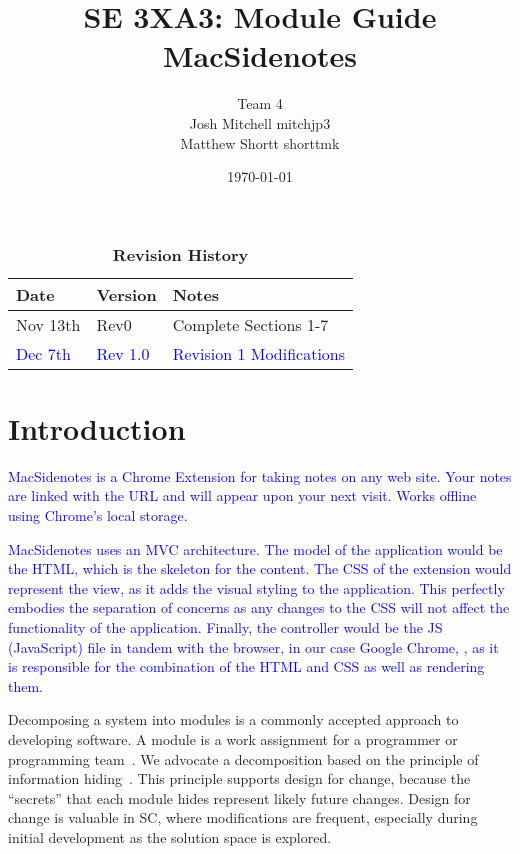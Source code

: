 \documentclass[12pt, titlepage]{article}
\title{SE 3XA3: Module Guide\\MacSidenotes}
\author{Team 4
	\\ Josh Mitchell mitchjp3
	\\ Matthew Shortt shorttmk
}
\date{\today}
\begin{document}
\maketitle

\tableofcontents
\listoftables
\listoffigures

\begin{table}[H]
\caption{\bf Revision History}
\begin{tabularx}{\textwidth}{p{3cm}p{2cm}X}
\toprule {\bf Date} & {\bf Version} & {\bf Notes}\\
\midrule
Nov 13th & Rev0 & Complete Sections 1-7\\
\textcolor{blue}{Dec 7th} & \textcolor{blue}{Rev 1.0} & \textcolor{blue}{Revision 1 
Modifications}\\
\bottomrule
\end{tabularx}
\end{table}

\newpage


\section{Introduction}

\textcolor{blue}{MacSidenotes is a Chrome Extension for taking notes on any web site. 
Your notes are linked with the URL and will appear upon your next visit. Works offline 
using Chrome's local storage.}

\textcolor{blue}{MacSidenotes uses an MVC architecture. The model of the application 
would be the HTML, which is the skeleton for the content. The CSS of the extension 
would represent the view, as it adds the visual styling to the application. This perfectly 
embodies the separation of concerns as any changes to the CSS will not affect the 
functionality of the application. Finally, the controller would be the JS (JavaScript) file in 
tandem with the browser, in our case Google Chrome, , as it is responsible for the 
combination of the HTML and CSS as well as rendering them.  }

Decomposing a system into modules is a commonly accepted approach to developing
software.  A module is a work assignment for a programmer or programming
team~\citep{ParnasEtAl1984}.  We advocate a decomposition
based on the principle of information hiding~\citep{Parnas1972a}.  This
principle supports design for change, because the ``secrets'' that each module
hides represent likely future changes.  Design for change is valuable in SC,
where modifications are frequent, especially during initial development as the
solution space is explored.  
\end{document}
